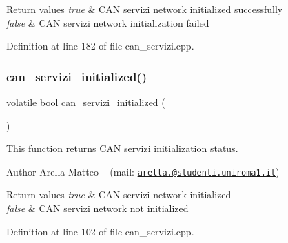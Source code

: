 \begin{DoxyRetVals}{Return values}
{\em true} & C\+AN servizi network initialized successfully \\
\hline
{\em false} & C\+AN servizi network initialization failed \\
\hline
\end{DoxyRetVals}


Definition at line 182 of file can\+\_\+servizi.\+cpp.

\mbox{\label{group___c_a_n__servizi__group_gaa460928ec03256a076ebafceab10c2be}} 
\subsubsection{\texorpdfstring{can\+\_\+servizi\+\_\+initialized()}{can\_servizi\_initialized()}}
{\footnotesize\ttfamily volatile bool can\+\_\+servizi\+\_\+initialized (\begin{DoxyParamCaption}{ }\end{DoxyParamCaption})}



This function returns C\+AN servizi initialization status. 

\begin{DoxyAuthor}{Author}
Arella Matteo ~\newline
 (mail\+: \href{mailto:arella.1646983@studenti.uniroma1.it}{\tt arella.@studenti.\+uniroma1.\+it})
\end{DoxyAuthor}

\begin{DoxyRetVals}{Return values}
{\em true} & C\+AN servizi network initialized \\
\hline
{\em false} & C\+AN servizi network not initialized \\
\hline
\end{DoxyRetVals}


Definition at line 102 of file can\+\_\+servizi.\+cpp.

\mbox{\label{group___c_a_n__servizi__group_ga43e9ef52770f760c5751d83b138c7e6b}} 
